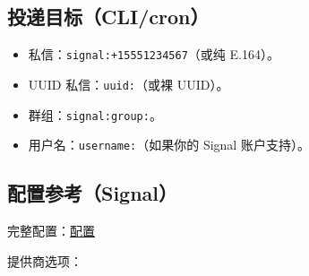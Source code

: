 \subsection{投递目标（CLI/cron）}


\begin{itemize}
  \item 私信：\texttt{signal:+15551234567}（或纯 E.164）。
  \item UUID 私信：\texttt{uuid:}（或裸 UUID）。
  \item 群组：\texttt{signal:group:}。
  \item 用户名：\texttt{username:}（如果你的 Signal 账户支持）。
\end{itemize}


\subsection{配置参考（Signal）}


完整配置：\href{/gateway/configuration}{配置}

提供商选项：

